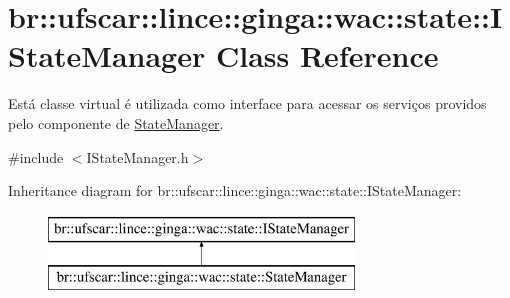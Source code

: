 \hypertarget{classbr_1_1ufscar_1_1lince_1_1ginga_1_1wac_1_1state_1_1IStateManager}{
\section{br::ufscar::lince::ginga::wac::state::IStateManager Class Reference}
\label{classbr_1_1ufscar_1_1lince_1_1ginga_1_1wac_1_1state_1_1IStateManager}
}


Está classe virtual é utilizada como interface para acessar os serviços providos pelo componente de \hyperlink{classbr_1_1ufscar_1_1lince_1_1ginga_1_1wac_1_1state_1_1StateManager}{StateManager}.  




{\ttfamily \#include $<$IStateManager.h$>$}

Inheritance diagram for br::ufscar::lince::ginga::wac::state::IStateManager:\begin{figure}[H]
\begin{center}
\leavevmode
\includegraphics[height=2cm]{classbr_1_1ufscar_1_1lince_1_1ginga_1_1wac_1_1state_1_1IStateManager}
\end{center}
\end{figure}
